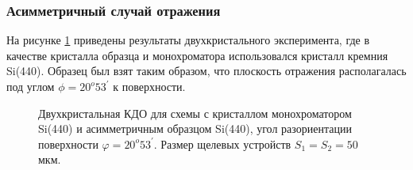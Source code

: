   \subsubsection{Асимметричный случай отражения}
  На рисунке \ref{ris:assymetric_exp_50}
  приведены результаты двухкристального эксперимента, где в качестве
  кристалла образца и монохроматора использовался кристалл кремния Si(440). Образец был взят таким
  образом, что плоскость отражения располагалась под углом $\phi = 20^o 53^{'}$ к поверхности.

  \begin{figure}[H]
    \centering
    \hfill
    \caption{Двухкристальная КДО для схемы с кристаллом монохроматором Si(440) и асимметричным образцом Si(440),
    угол разориентации поверхности $\varphi = 20^o53^{'}$. Размер щелевых устройств $S_1 = S_2 = 50$ мкм.}
    \label{ris:assymetric_exp_50}
  \end{figure}

